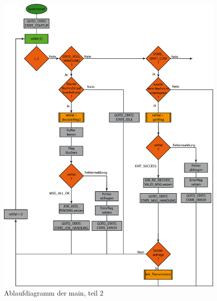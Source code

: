 \begin{figure}[h]
\includegraphics[scale = 0.8]{./main2.png}
\hspace{-14pt}
\caption{Ablaufdiagramm der main, teil 2}
\end{figure} 

